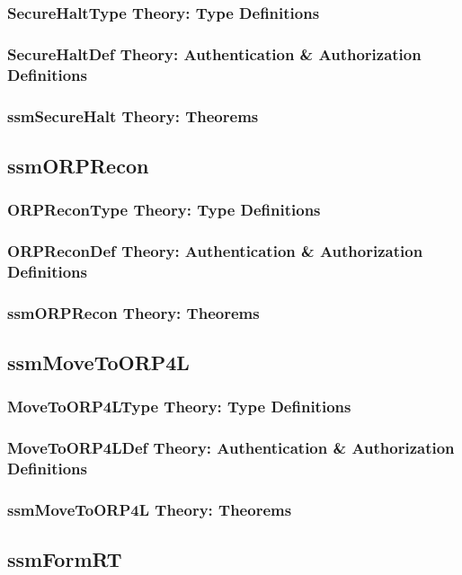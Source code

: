 \documentclass[hidelinks,12pt,a4paper]{report}
\begin{document}
\begin{appendices}
\subsubsection{SecureHaltType Theory: Type Definitions}
\subsubsection{SecureHaltDef Theory: Authentication \& Authorization Definitions}
\subsubsection{ssmSecureHalt Theory: Theorems}

\subsection{ssmORPRecon}
\subsubsection{ORPReconType Theory: Type Definitions}
\subsubsection{ORPReconDef Theory: Authentication \& Authorization Definitions}
\subsubsection{ssmORPRecon Theory: Theorems}

\subsection{ssmMoveToORP4L}
\subsubsection{MoveToORP4LType Theory: Type Definitions}
\subsubsection{MoveToORP4LDef Theory: Authentication \& Authorization Definitions}
\subsubsection{ssmMoveToORP4L Theory: Theorems}

\subsection{ssmFormRT}

\end{appendices}
\end{document}

